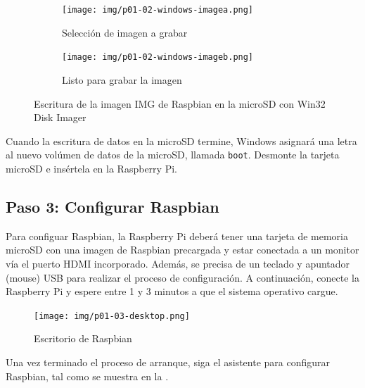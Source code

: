 \documentclass[letterpaper,10.5pt]{article}
\begin{document}
\begin{figure}[H]
	\centering%
	\begin{subfigure}[b]{0.5\linewidth}
		\centering
		\texttt{[image: img/p01-02-windows-imagea.png]} %
		\caption{Selección de imagen a grabar}
		\label{fig:write-image-windows-a} %
	\end{subfigure}%
	\begin{subfigure}[b]{0.5\linewidth}
		\centering
		\texttt{[image: img/p01-02-windows-imageb.png]} %
		\caption{Listo para grabar la imagen}
		\label{fig:write-image-windows-b} %
	\end{subfigure}
	\caption{Escritura de la imagen IMG de Raspbian en la microSD con Win32 Disk Imager}%
	\label{fig:write-image-windows} %
\end{figure}

Cuando la escritura de datos en la microSD termine, Windows asignará una letra al nuevo volúmen de datos de la microSD, llamada \texttt{boot}.
Desmonte la tarjeta microSD e insértela en la Raspberry Pi.

%
%
\clearpage
\subsection{Paso 3: Configurar Raspbian}%
Para configuar Raspbian, la Raspberry Pi deberá tener una tarjeta de memoria microSD con una imagen de Raspbian precargada y estar conectada a un monitor vía el puerto HDMI incorporado.
Además, se precisa de un teclado y apuntador (mouse) USB para realizar el proceso de configuración.
A continuación, conecte la Raspberry Pi y espere entre 1 y 3 minutos a que el sistema operativo cargue.

\begin{figure}[H]
	\centering
	\texttt{[image: img/p01-03-desktop.png]} %
	\caption{Escritorio de Raspbian}
	\label{fig:raspbian-desktop} %
\end{figure}

Una vez terminado el proceso de arranque, siga el asistente para configurar Raspbian, tal como se muestra en la .
\end{document}
